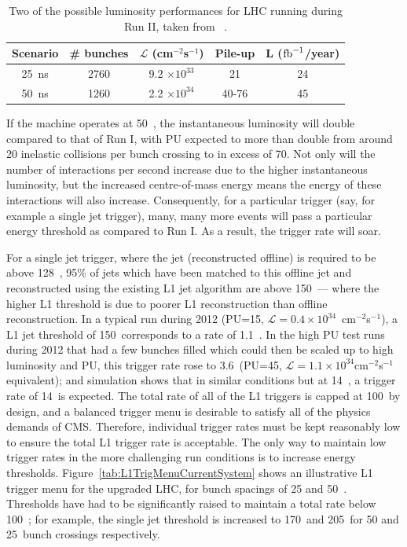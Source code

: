 \begin{table}[h]
\begin{tabular}{c|c|c|c|c}
Scenario & \# bunches & $\mathcal{L}$ (cm$^{-2}$s$^{-1}$) & Pile-up & L ($\mathrm{fb}^{-1}$/year) \\ \hline
25~ns & 2760 & 9.2 $\times 10^{33}$ & 21 & 24 \\ 
50~ns & 1260 & 2.2 $\times 10^{34}$ & 40-76 & 45 \\ \hline
\end{tabular}
\caption{\label{lumiProgramme}Two of the possible luminosity performances for \ac{LHC} running during Run II, taken from ~\cite{Tapper:1556311}.}
\end{table}


If the machine operates at 50~\ns, the instantaneous luminosity will double compared to that of Run I, with PU expected to more than double from around 20 inelastic collisions per bunch crossing to in excess of 70.
Not only will the number of interactions per second increase due to the higher instantaneous luminosity, but the increased centre-of-mass energy means the energy of these interactions will also increase. 
Consequently, for a particular trigger (say, for example a single jet trigger), many, many more events will pass a particular energy threshold as compared to Run I. 
As a result, the trigger rate will soar.

For a single jet trigger, where the jet (reconstructed offline) is required to be above 128~\GeV, 95\% of jets which have been matched to this offline jet and reconstructed using the existing \ac{L1} jet algorithm are above 150~\GeV --- where the higher \ac{L1} threshold is due to poorer \ac{L1} reconstruction than offline reconstruction. 
In a typical run during 2012 (PU=15, $\mathcal{L}=0.4 \times 10^{34}$~cm$^{-2}$s$^{-1}$), a \ac{L1} jet threshold of 150~\GeV corresponds to a rate of 1.1~\kHz.
In the high \ac{PU} test runs during 2012 that had a few bunches filled which could then be scaled up to high luminosity and \ac{PU}, this trigger rate rose to 3.6~\kHz (PU=45, $\mathcal{L}=1.1 \times 10^{34}$cm$^{-2}$s$^{-1}$ equivalent); and simulation shows that in similar conditions but at 14~\TeV, a trigger rate of 14~\kHz is expected.
The total rate of all of the \ac{L1} triggers is capped at 100~\kHz by design, 
and a balanced trigger menu is desirable to satisfy all of the physics demands of \ac{CMS}.
Therefore, individual trigger rates must be kept reasonably low to ensure the total \ac{L1} trigger rate is acceptable.  
The only way to maintain low trigger rates in the more challenging run conditions is to increase energy thresholds.
Figure~\ref{tab:L1TrigMenuCurrentSystem} shows an illustrative \ac{L1} trigger menu for the upgraded \ac{LHC}, for bunch spacings of 25 and 50~\ns. 
Thresholds have had to be significantly raised to maintain a total rate below 100~\kHz; for example, the single jet threshold is increased to 170~\GeV and 205~\GeV for 50 and 25~\ns bunch crossings respectively.


